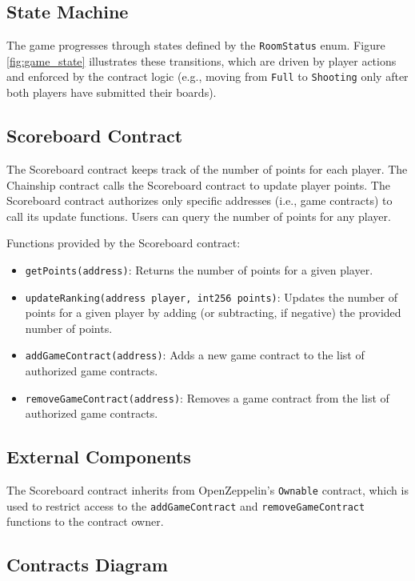 \documentclass{article}
\begin{document}
    \subsection{State Machine}
    The game progresses through states defined by the \texttt{RoomStatus} enum. Figure \ref{fig:game_state} illustrates these transitions, which are driven by player actions and enforced by the contract logic (e.g., moving from \texttt{Full} to \texttt{Shooting} only after both players have submitted their boards).

    \subsection{Scoreboard Contract}

    The Scoreboard contract keeps track of the number of points for each player. The Chainship contract calls the Scoreboard contract to update player points. The Scoreboard contract authorizes only specific addresses (i.e., game contracts) to call its update functions. Users can query the number of points for any player.

    Functions provided by the Scoreboard contract:
    \begin{itemize}
        \item \texttt{getPoints(address)}: Returns the number of points for a given player.
        \item \texttt{updateRanking(address player, int256 points)}: Updates the number of points for a given player by adding (or subtracting, if negative) the provided number of points.
        \item \texttt{addGameContract(address)}: Adds a new game contract to the list of authorized game contracts.
        \item \texttt{removeGameContract(address)}: Removes a game contract from the list of authorized game contracts.
    \end{itemize}

    \subsection{External Components}

    The Scoreboard contract inherits from OpenZeppelin's \texttt{Ownable} contract, which is used to restrict access to the \texttt{addGameContract} and \texttt{removeGameContract} functions to the contract owner.

    \subsection{Contracts Diagram}
\end{document}
